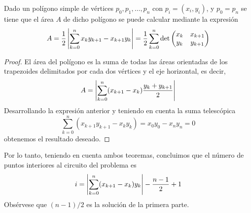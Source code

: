 \documentclass[a4paper,12pt]{article}
\begin{document}
\begin{teo}
    Dado un polígono simple de vértices $p_0, p_1,\dots, p_n$ con $p_i=(x_i,y_i)$, y $p_0=p_n$ se tiene que el área $A$ de dicho polígono se puede calcular mediante la expresión
    $$A=\frac{1}{2}\left| \sum_{k=0}^nx_ky_{k+1} - x_{k+1}y_k\right|=\frac{1}{2}\sum_{k=0}^n\det\begin{pmatrix}
        x_k & x_{k+1} \\
        y_k & y_{k+1}
    \end{pmatrix}$$    
\end{teo}

\begin{proof}
    El área del polígono es la suma de todas las áreas orientadas de los trapezoides delimitados por cada dos vértices y el eje horizontal, es decir,
    $$A=\left| \sum_{k=0}^n(x_{k+1}-x_k)\frac{y_k+y_{k+1}}{2}\right|$$
    Desarrollando la expresión anterior y teniendo en cuenta la suma telescópica
    $$\sum_{k=0}^n(x_{k+1}y_{k+1}-x_ky_k)=x_0y_0-x_ny_n=0$$
    obtenemos el resultado deseado.    
\end{proof}

Por lo tanto, teniendo en cuenta ambos teoremas, concluimos que el número de puntos interiores al circuito del problema es
$$i= \left| \sum_{k=0}^n(x_{k+1} - x_k)y_k\right|-\frac{n-1}{2}+1$$
Obsérvese que $(n-1)/2$ es la solución de la primera parte.
\end{document}
